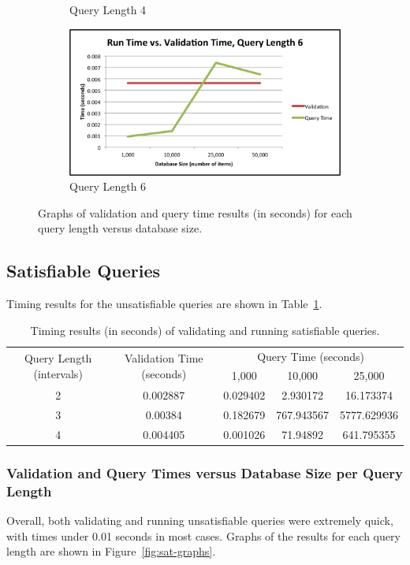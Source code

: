 \documentclass{achemso}
\begin{document}
\begin{figure}
\begin{subfigure}[b]{0.45\textwidth}
\caption{Query Length 4}
\label{fig:unsat4}
\end{subfigure}
\quad
\begin{subfigure}[b]{0.45\textwidth}
\centering
\includegraphics[width=\textwidth]{charts/unsat_6_graph}
\caption{Query Length 6}
\label{fig:unsat6}
\end{subfigure}

\caption{Graphs of validation and query time results (in seconds) for each query length versus database size.}\label{fig:unsat-graphs}
\end{figure}
\subsection{Satisfiable Queries}
Timing results for the unsatisfiable queries are shown in Table~\ref{tab:sat-results}. 

\begin{table}
\begin{tabular}{|c||c||c|c|c|}\hline
\multirow{2}{*}{Query Length (intervals)} & \multirow{2}{*}{Validation Time (seconds)} &  \multicolumn{3}{|c|}{Query Time (seconds)} \\\cline{3-5}
 & & 1,000 & 10,000 & 25,000  \\\hline\hline
2 & 0.002887 & 0.029402 & 2.930172 & 16.173374 \\\hline
3 & 0.00384 & 0.182679 & 767.943567 & 5777.629936 \\\hline
4 & 0.004405 & 0.001026 & 71.94892 & 641.795355 \\\hline
\end{tabular}
\caption{Timing results (in seconds) of validating and running satisfiable queries.}\label{tab:sat-results}
\end{table}

\subsubsection{Validation and Query Times versus Database Size per Query Length} 
Overall, both validating and running unsatisfiable queries were extremely quick, with times under 0.01 seconds in most cases. Graphs of the results for each query length are shown in Figure~\ref{fig:sat-graphs}.
\end{document}
